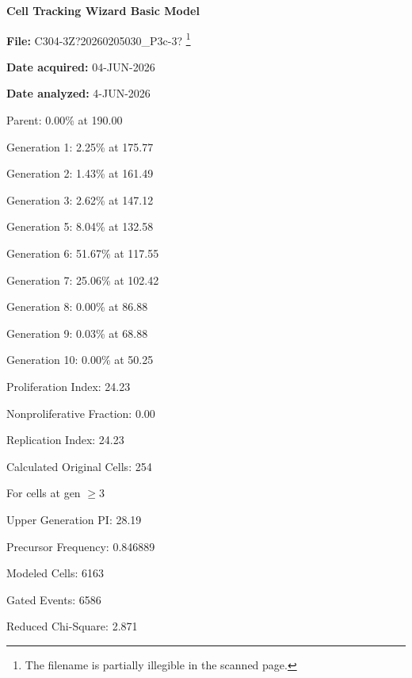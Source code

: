 \documentclass[UTF8,10pt,a4paper,fontset=fandol]{ctexart}
\begin{document}
\noindent
\begin{minipage}[t]{0.47\linewidth}
\centering
{}
\end{minipage}
\hfill
\begin{minipage}[t]{0.47\linewidth}
\small
\textbf{Cell Tracking Wizard Basic Model}

\textbf{File:} C304-3Z?20260205030\_P3c-3?%
\footnote{The filename is partially illegible in the scanned page.}

\textbf{Date acquired:} 04-JUN-2026

\textbf{Date analyzed:} 4-JUN-2026

\medskip

Parent: 0.00\% at 190.00

Generation 1: 2.25\% at 175.77

Generation 2: 1.43\% at 161.49

Generation 3: 2.62\% at 147.12

Generation 5: 8.04\% at 132.58

Generation 6: 51.67\% at 117.55

Generation 7: 25.06\% at 102.42

Generation 8: 0.00\% at 86.88

Generation 9: 0.03\% at 68.88

Generation 10: 0.00\% at 50.25

\medskip

Proliferation Index: 24.23

Nonproliferative Fraction: 0.00

Replication Index: 24.23

Calculated Original Cells: 254

\medskip

For cells at gen $\geq 3$

Upper Generation PI: 28.19

Precursor Frequency: 0.846889

\medskip

Modeled Cells: 6163

Gated Events: 6586

Reduced Chi-Square: 2.871
\end{minipage}

\vspace{2cm}

\noindent
\begin{minipage}[t]{0.31\linewidth}
\centering
{}
\end{minipage}
\hfill
\begin{minipage}[t]{0.31\linewidth}
\centering
{}
\end{minipage}
\hfill
\begin{minipage}[t]{0.31\linewidth}
\centering
{}
\end{minipage}
\end{document}
